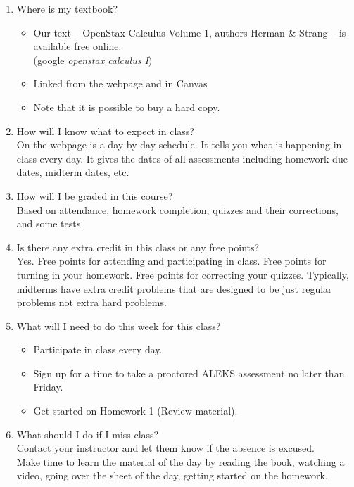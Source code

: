 \documentclass[11pt,fleqn]{article}
\begin{document}
\begin{enumerate}
\vfill
\item Where is my textbook?\\
\begin{itemize}
\item Our text -- OpenStax Calculus Volume 1, authors Herman \& Strang -- is available free online. \\
(google \emph{openstax calculus I})
\item Linked from the webpage and in Canvas
\item Note that it is possible to buy a hard copy. 
\end{itemize}
\vfill
\item How will I know what to expect in class?\\
On the webpage is a day by day schedule. It tells you what is happening in class every day. It gives the dates of all assessments including homework due dates, midterm dates, etc. 
\vfill
\item How will I be graded in this course? \\
Based on attendance, homework completion, quizzes and their corrections, and some tests
\vfill
\item Is there any extra credit in this class or any free points?\\
Yes. 
Free points for attending and participating in class. Free points for turning in your homework. Free points for correcting your quizzes.
Typically, midterms have extra credit problems that are designed to be just regular problems not extra hard problems.
\vfill
\item What will I need to do this week for this class?\\
\begin{itemize}
\item Participate in class every day. 
\item Sign up for a time to take a proctored ALEKS assessment no later than Friday.
\item Get started on Homework 1 (Review material).
\end{itemize}
\vfill

\item What should I do if I miss class?\\
Contact your instructor and let them know if the absence is excused.\\
Make time to learn the material of the day by reading the book, watching a video, going over the sheet of the day, getting started on the homework.
\vfill


\end{enumerate}
\end{document}
